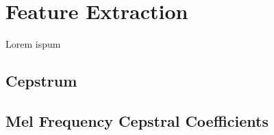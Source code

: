 \documentclass[a4paper,onecolumn,12pt]{article}
\begin{document}
\graphicspath{{images/}}
\renewcommand{\figurename}{\small Figure}
\newcommand{\figureref}[1]{Fig. (\ref{fig:#1})}
\newcommand{\equationref}[1]{Eq. (\ref{eq:#1})}
\newcommand{\bigsum}{\displaystyle\sum}


\section{Feature Extraction}

Lorem ispum

\subsection{Cepstrum}
\subsection{Mel Frequency Cepstral Coefficients}


\begin{thebibliography}{9}
\end{thebibliography}
\end{document}

